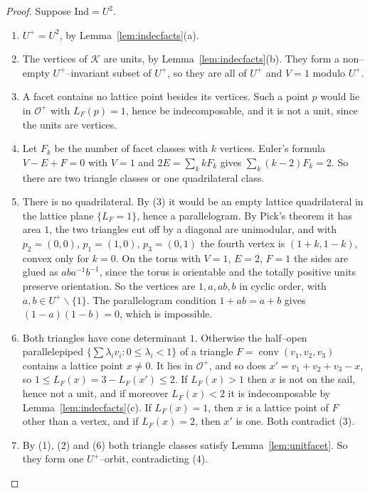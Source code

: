 \documentclass[11pt,reqno]{amsart}
\theoremstyle{plain}
\theoremstyle{definition}
\newcommand{\conv}{\operatorname{conv}}
\begin{document}
\begin{proof}
Suppose $\mathrm{Ind}=U^2$.
\begin{enumerate}[label=\textup{(\arabic*)},leftmargin=2.2em]
\item $U^+=U^2$, by Lemma~\ref{lem:indecfacts}(a).
\item The vertices of $\mathcal K$ are units, by Lemma~\ref{lem:indecfacts}(b). They form a non--empty
$U^+$--invariant subset of $U^+$, so they are all of $U^+$ and $V=1$ modulo $U^+$.
\item A facet contains no lattice point besides its vertices. Such a point $p$ would lie in $\mathcal O^+$ with
$L_F(p)=1$, hence be indecomposable, and it is not a unit, since the units are vertices.
\item Let $F_k$ be the number of facet classes with $k$ vertices. Euler's formula $V-E+F=0$ with $V=1$ and
$2E=\sum_kkF_k$ gives $\sum_k(k-2)F_k=2$. So there are two triangle classes or one quadrilateral class.
\item There is no quadrilateral. By (3) it would be an empty lattice quadrilateral in the lattice plane
$\{L_F=1\}$, hence a parallelogram. By Pick's theorem it has area $1$, the two triangles cut off by a
diagonal are unimodular, and with $p_2=(0,0)$, $p_1=(1,0)$, $p_3=(0,1)$ the fourth vertex is $(1+k,1-k)$,
convex only for $k=0$. On the torus with $V=1$, $E=2$, $F=1$ the sides are glued as $aba^{-1}b^{-1}$, since the
torus is orientable and the totally positive units preserve orientation. So the vertices are
$1,a,ab,b$ in cyclic order, with $a,b\in U^+\smallsetminus\{1\}$. The parallelogram condition $1+ab=a+b$ gives
$(1-a)(1-b)=0$, which is impossible.
\item Both triangles have cone determinant $1$. Otherwise the half--open parallelepiped
$\{\sum\lambda_iv_i:0\le\lambda_i<1\}$ of a triangle $F=\conv(v_1,v_2,v_3)$ contains a lattice point $x\ne0$. It lies in
$\mathcal O^+$, and so does $x'=v_1+v_2+v_3-x$, so $1\le L_F(x)=3-L_F(x')\le2$. If $L_F(x)>1$ then $x$ is not on the
sail, hence not a unit, and if moreover $L_F(x)<2$ it is indecomposable by Lemma~\ref{lem:indecfacts}(c). If
$L_F(x)=1$, then $x$ is a lattice point of $F$ other than a vertex, and if $L_F(x)=2$, then $x'$ is one. Both
contradict (3).
\item By (1), (2) and (6) both triangle classes satisfy Lemma~\ref{lem:unitfacet}. So they form one
$U^+$--orbit, contradicting (4).\qedhere
\end{enumerate}
\end{proof}
\end{document}
